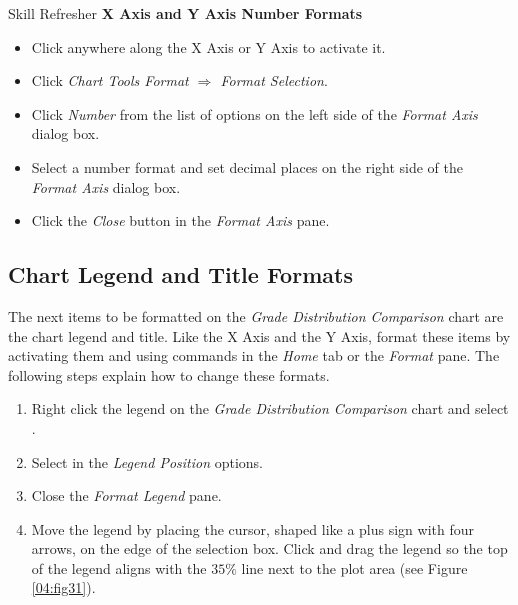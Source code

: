 \begin{center}
	\begin{sklbox}{Skill Refresher}
		\textbf{X Axis and Y Axis Number Formats}
		\\
		\begin{itemize}
			\setlength{\itemsep}{0pt}
			\setlength{\parskip}{0pt}
			\setlength{\parsep}{0pt}

			\item Click anywhere along the X Axis or Y Axis to activate it.
			\item Click \textit{Chart Tools Format $ \Rightarrow $ Format Selection}.
			\item Click \textit{Number} from the list of options on the left side of the \textit{Format Axis} dialog box.
			\item Select a number format and set decimal places on the right side of the \textit{Format Axis} dialog box.
			\item Click the \textit{Close} button in the \textit{Format Axis} pane.
			
		\end{itemize}
	\end{sklbox}
\end{center}

\subsection{Chart Legend and Title Formats}

The next items to be formatted on the \textit{Grade Distribution Comparison} chart are the chart legend and title. Like the X Axis and the Y Axis, format these items by activating them and using commands in the \textit{Home} tab or the \textit{Format} pane. The following steps explain how to change these formats.

\begin{enumerate}
	\item Right click the legend on the \textit{Grade Distribution Comparison} chart and select .
	\item Select  in the \textit{Legend Position} options. 
	\item Close the \textit{Format Legend} pane.
	\item Move the legend by placing the cursor, shaped like a plus sign with four arrows, on the edge of the selection box. Click and drag the legend so the top of the legend aligns with the $ 35\% $ line next to the plot area (see Figure \ref{04:fig31}).
\end{enumerate}

